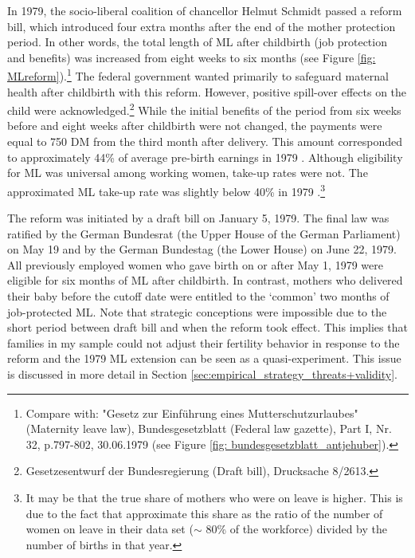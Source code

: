 \documentclass[11pt, a4paper, draft]{article} %
\begin{document}
In 1979, the socio-liberal coalition of chancellor Helmut Schmidt passed a reform bill, which introduced four extra months after the end of the mother protection period. In other words, the total length of ML after childbirth (job protection and benefits) was increased from eight weeks to six months (see Figure \ref{fig: MLreform}).\footnote{Compare with: "Gesetz zur Einführung eines Mutterschutzurlaubes" (Maternity leave law), Bundesgesetzblatt (Federal law gazette), Part I, Nr. 32, p.797-802, 30.06.1979 (see Figure \ref{fig: bundesgesetzblatt_antjehuber}).} The federal government wanted primarily to safeguard maternal health after childbirth with this reform. However, positive spill-over effects on the child were acknowledged.\footnote{Gesetzesentwurf der Bundesregierung (Draft bill), Drucksache 8/2613.} While the initial benefits of the period from six weeks before and eight weeks after childbirth were not changed, the payments were equal to 750 DM from the third month after delivery. This amount corresponded to approximately 44\% of average pre-birth earnings in 1979 \citep{schonberg2014expansions}. Although eligibility for ML was universal among working women, take-up rates were not. The approximated ML take-up rate was slightly below 40\% in 1979 \citep{Dustmann2012}.\footnote{It may be that the true share of mothers who were on leave is higher. This is due to the fact that \cite{Dustmann2012} approximate this share as the ratio of the number of women on leave in their data set ($\sim$ 80\% of the workforce) divided by the number of births in that year.}


The reform was initiated by a draft bill on January 5, 1979. The final law was ratified by the German Bundesrat (the Upper House of the German Parliament) on May 19 and by the German Bundestag (the Lower House) on June 22, 1979. All previously employed women who gave birth on or after May 1, 1979 were eligible for six months of ML after childbirth. In contrast, mothers who delivered their baby before the cutoff date were entitled to the `common' two months of job-protected ML. Note that strategic conceptions were impossible due to the short period between draft bill and when the reform took effect. This implies that families in my sample could not adjust their fertility behavior in response to the reform and the 1979 ML extension can be seen as a quasi-experiment. This issue is discussed in more detail in Section \ref{sec:empirical_strategy_threats+validity}.
\end{document}
